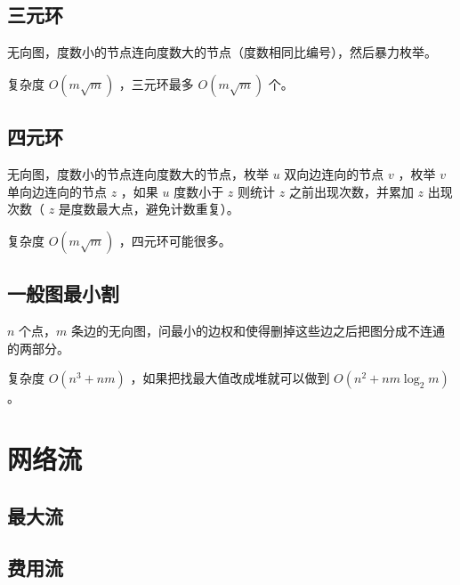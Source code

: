 

\newpage

\subsection{三元环}

无向图，度数小的节点连向度数大的节点（度数相同比编号），然后暴力枚举。

复杂度 $O(m\sqrt m)$ ，三元环最多 $O(m\sqrt m)$ 个。



\subsection{四元环}

无向图，度数小的节点连向度数大的节点，枚举 $u$ 双向边连向的节点 $v$ ，枚举 $v$ 单向边连向的节点 $z$ ，如果 $u$ 度数小于 $z$ 则统计 $z$ 之前出现次数，并累加 $z$ 出现次数（ $z$ 是度数最大点，避免计数重复）。

复杂度 $O(m\sqrt m)$ ，四元环可能很多。



\newpage


\subsection{一般图最小割}

$n$ 个点，$m$ 条边的无向图，问最小的边权和使得删掉这些边之后把图分成不连通的两部分。

复杂度 $O(n^3+nm)$ ，如果把找最大值改成堆就可以做到 $O(n^2+nm\log_2m)$ 。



\newpage

\section{网络流}

\subsection{最大流}



\vspace{-0.4cm}

\subsection{费用流}

